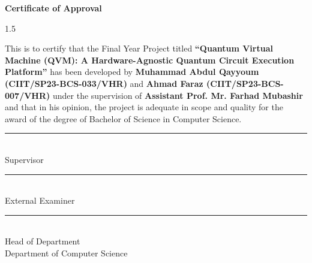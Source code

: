 

\newpage
\thispagestyle{empty}

\begin{center}
\textbf{\LARGE Certificate of Approval}
\end{center}

\vspace{1.5cm}

\begin{spacing}{1.5}

This is to certify that the Final Year Project titled 
\textbf{``Quantum Virtual Machine (QVM): A Hardware-Agnostic Quantum Circuit Execution Platform''} 
has been developed by \textbf{Muhammad Abdul Qayyoum (CIIT/SP23-BCS-033/VHR)} and \textbf{Ahmad Faraz (CIIT/SP23-BCS-007/VHR)} under the supervision of \textbf{Assistant Prof. Mr. Farhad Mubashir} and that in his opinion, the project is adequate in scope and quality for the award of the degree of Bachelor of Science in Computer Science.

\end{spacing}

\vspace{2.5cm}
\noindent\rule{6cm}{0.4pt}  
\\ 
Supervisor

\vspace{2.5cm}
\noindent\rule{6cm}{0.4pt}  
\\ 
External Examiner

\vspace{2.5cm}

\noindent\rule{6cm}{0.4pt}  
\\ 
Head of Department  
\\ 
Department of Computer Science

\newpage
